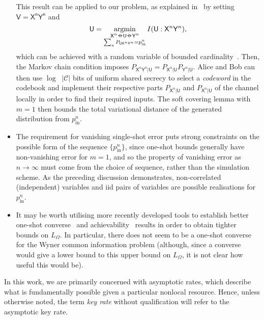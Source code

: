 \documentclass[10pt, a4paper]{article}
\numberwithin{equation}{section} %
\theoremstyle{definition}
\theoremstyle{plain}
\DeclareMathOperator*{\argmin}{argmin}
\newcommand{\abs}[1]{\mathop{}\left\lvert#1\right\rvert}
\newcommand{\?}{\mathrel{?}} %
\newcommand*\markov{\mathrel{\ooalign{\hidewidth$\circ$\hidewidth\cr$-$\cr}}} %
\newcommand{\crv}[1]{\mathsf{#1}}
\newcommand{\prin}[1][p]{#1_{\mathrm{in}}}
\begin{document}
\begin{itemize}
        This result can be applied to our problem, as explained in~\cite[Sec. V-B]{CorrReview} by setting \(\crv{V} = \crv{X^n Y^n}\) and 
        \begin{equation}
        \crv{U} = \argmin_{\substack{
        \crv{X}^n \markov \crv{U} \markov \crv{Y}^n \\
        \sum_u P_{\crv{U}\crv{X}^n\crv{Y}^n} = \prin^n
      }
      } I(\crv{U}:\crv{X}^n\crv{Y}^n),
        \end{equation}
        which can be achieved with a random variable of bounded cardinality~\cite[Sec. VI.A]{DistrChanSynth}. Then, the Markov chain condition imposes \(P_{\crv{X}^n\crv{Y}^n|\crv{U}} = P_{\crv{X}^n|\crv{U}} P_{\crv{Y}^n|\crv{U}}\). Alice and Bob can then use \(\log \abs{\mathcal{C}}\) bits of uniform shared secrecy to select a \emph{codeword} in the codebook and implement their respective parts \(P_{\crv{X}^n|\crv{U}}\) and \(P_{\crv{X}^n|\crv{U}}\) of the channel locally in order to find their required inputs. The soft covering lemma with \(m=1\) then bounds the total variational distance of the generated distribution from \(\prin^n\).
      \item The requirement for vanishing single-shot error puts strong constraints on the possible form of the sequence \(\{\prin^n\}\), since one-shot bounds generally have non-vanishing error for \(m=1\), and so the property of vanishing error as \(n\to\infty\) must come from the choice of sequence, rather than the simulation scheme. As the preceding discussion demonstrates, non-correlated (independent) variables and iid pairs of variables are possible realisations for \(\prin^n\).
      \item It may be worth utilising more recently developed tools to establish better one-shot converse~\cite{BLIneqStrongConv} and achievability~\cite{PoissonMatch} results in order to obtain tighter bounds on \(L_{\Omega}\). In particular, there does not seem to be a one-shot converse for the Wyner common information problem (although, since a converse would give a lower bound to this upper bound on \(L_{\Omega}\), it is not clear how useful this would be).
    \end{itemize}

  In this work, we are primarily concerned with asymptotic rates, which describe what is fundamentally possible given a particular nonlocal resource. Hence, unless otherwise noted, the term \emph{key rate} without qualification will refer to the asymptotic key rate.
\end{document}
